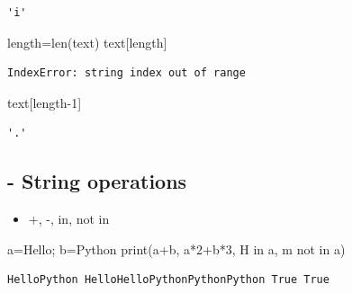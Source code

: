 \documentclass[
  letterpaper,
  DIV=11,
  numbers=noendperiod]{scrreprt}
\newenvironment{Shaded}{\begin{snugshade}}{\end{snugshade}}
\newcommand{\BuiltInTok}[1]{\textcolor[rgb]{0.00,0.23,0.31}{#1}}
\newcommand{\DecValTok}[1]{\textcolor[rgb]{0.68,0.00,0.00}{#1}}
\newcommand{\KeywordTok}[1]{\textcolor[rgb]{0.00,0.23,0.31}{#1}}
\newcommand{\NormalTok}[1]{\textcolor[rgb]{0.00,0.23,0.31}{#1}}
\newcommand{\OperatorTok}[1]{\textcolor[rgb]{0.37,0.37,0.37}{#1}}
\newcommand{\StringTok}[1]{\textcolor[rgb]{0.13,0.47,0.30}{#1}}
\providecommand{\tightlist}{%
  \setlength{\itemsep}{0pt}\setlength{\parskip}{0pt}}\usepackage{longtable,booktabs,array}
\begin{document}
\begin{verbatim}
'i'
\end{verbatim}

\begin{Shaded}
\begin{Highlighting}[]
\NormalTok{length}\OperatorTok{=}\BuiltInTok{len}\NormalTok{(text)}
\NormalTok{text[length]}
\end{Highlighting}
\end{Shaded}

\begin{verbatim}
IndexError: string index out of range
\end{verbatim}

\begin{Shaded}
\begin{Highlighting}[]
\NormalTok{text[length}\OperatorTok{{-}}\DecValTok{1}\NormalTok{]}
\end{Highlighting}
\end{Shaded}

\begin{verbatim}
'.'
\end{verbatim}

\subsection{- String operations}\label{string-operations}

\begin{itemize}
\tightlist
\item
  +, -, in, not in
\end{itemize}

\begin{Shaded}
\begin{Highlighting}[]
\NormalTok{a}\OperatorTok{=}\StringTok{\textquotesingle{}Hello\textquotesingle{}}\OperatorTok{;}\NormalTok{ b}\OperatorTok{=}\StringTok{\textquotesingle{}Python\textquotesingle{}}
\BuiltInTok{print}\NormalTok{(a}\OperatorTok{+}\NormalTok{b, a}\OperatorTok{*}\DecValTok{2}\OperatorTok{+}\NormalTok{b}\OperatorTok{*}\DecValTok{3}\NormalTok{, }\StringTok{\textquotesingle{}H\textquotesingle{}} \KeywordTok{in}\NormalTok{ a, }\StringTok{\textquotesingle{}m\textquotesingle{}} \KeywordTok{not} \KeywordTok{in}\NormalTok{ a)}
\end{Highlighting}
\end{Shaded}

\begin{verbatim}
HelloPython HelloHelloPythonPythonPython True True
\end{verbatim}
\end{document}
